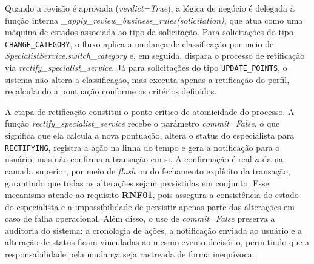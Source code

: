 Quando a revisão é aprovada (\textit{verdict=True}), a lógica de negócio é delegada à
função interna \textit{\_apply\_review\_business\_rules(solicitation)}, que atua como
uma máquina de estados associada ao tipo da solicitação. Para solicitações do tipo
\texttt{CHANGE\_CATEGORY}, o fluxo aplica a mudança de classificação por meio de
\textit{SpecialistService.switch\_category} e, em seguida, dispara o processo de
retificação via \textit{rectify\_specialist\_service}. Já para solicitações do tipo
\texttt{UPDATE\_POINTS}, o sistema não altera a classificação, mas executa apenas a
retificação do perfil, recalculando a pontuação conforme os critérios definidos.

A etapa de retificação constitui o ponto crítico de atomicidade do processo. A função
\textit{rectify\_specialist\_service} recebe o parâmetro \textit{commit=False}, o que
significa que ela calcula a nova pontuação, altera o status do especialista para
\texttt{RECTIFYING}, registra a ação na linha do tempo e gera a notificação para o
usuário, mas não confirma a transação em si. A confirmação é realizada na camada
superior, por meio de \textit{flush} ou do fechamento explícito da transação, garantindo
que todas as alterações sejam persistidas em conjunto. Esse mecanismo atende ao
requisito \textbf{RNF01}, pois assegura a consistência do estado do especialista e a
impossibilidade de persistir apenas parte das alterações em caso de falha operacional.
Além disso, o uso de \textit{commit=False} preserva a auditoria do sistema: a cronologia
de ações, a notificação enviada ao usuário e a alteração de status ficam vinculadas ao
mesmo evento decisório, permitindo que a responsabilidade pela mudança seja rastreada de
forma inequívoca.
